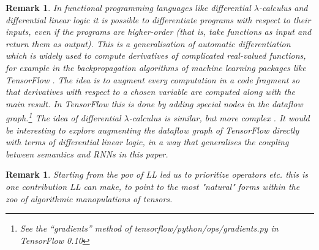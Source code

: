 \documentclass[english,letter paper,12pt,leqno]{article}
\theoremstyle{example}
\newtheorem{remark}[theorem]{Remark}
\numberwithin{equation}{section}
\begin{document}
\begin{remark} In functional programming languages like differential $\lambda$-calculus \cite{difflambda} and differential linear logic \cite{ehrhard-survey} it is possible to differentiate programs with respect to their inputs, even if the programs are higher-order (that is, take functions as input and return them as output). This is a generalisation of automatic differentiation \cite{griewank} which is widely used to compute derivatives of complicated real-valued functions, for example in the backpropagation algorithms of machine learning packages like TensorFlow \cite[\S 4.1]{tensorflow}. The idea is to augment every computation in a code fragment so that derivatives with respect to a chosen variable are computed along with the main result. In TensorFlow this is done by adding special nodes in the dataflow graph.\footnote{See the ``gradients'' method of tensorflow/python/ops/gradients.py in TensorFlow 0.10} The idea of differential $\lambda$-calculus is similar, but more complex \cite{manzyuk}. It would be interesting to explore augmenting the dataflow graph of TensorFlow directly with terms of differential linear logic, in a way that generalises the coupling between semantics and RNNs in this paper.
\end{remark}

\begin{remark} Starting from the pov of LL led us to prioritize operators etc. this is one contribution LL can make, to point to the most "natural" forms within the zoo of algorithmic manopulations of tensors.
\end{remark}
\end{document}
